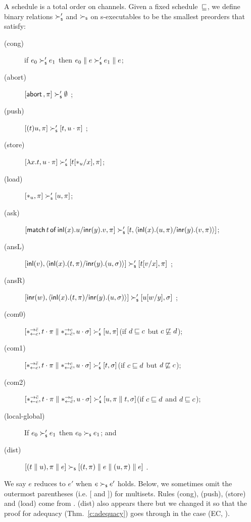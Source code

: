 A schedule is a total order on channels.
Given a fixed schedule~$\sqsubseteq$,
we define binary relations $\succ_{\mathsf s}'$ and $\succ_{\mathsf s}$
on s-executables
to be the smallest preorders
that satisfy:
\begin{description}
 \item[(cong)] if
      $e_0         \succ_{\mathsf s}' e_1$
      then
      $e_0 \parallel e \succ_{\mathsf s}' e_1\parallel e$\enspace;
 \item[(abort)] $[\mathsf{abort\,},\pi]\succ_{\mathsf s}' \emptyset$ \enspace;
 \item[(push)]
	    $[(t)u,\pi]      \succ_{\mathsf s}' [t,u\cdot\pi]$      \enspace;
 \item[(store)]
	    $[\lambda x.t,u\cdot\pi]
	     \succ_{\mathsf s}'
	     [t[\ast_u/x],      \pi]$\enspace;
 \item[(load)]
	    $[\ast_u,\pi]\succ_{\mathsf s}' [u,\pi]$\enspace;
 \item[(ask)]
      $[\mathsf{match}\,{t}\,\mathsf{of}\, \mathsf{inl}({x}). {u}/ \mathsf{inr}({y}). {v},\pi]\succ_{\mathsf s}' [t,\langle \mathsf{inl}({x}). ({u},{\pi})/ \mathsf{inr}({y}). ({v},{\pi})\rangle]$\enspace;
 \item[(ansL)]
           $[\mathsf{inl}({v}), \langle \mathsf{inl}({x}). ({t},{\pi})/ \mathsf{inr}({y}). ({u},{\sigma})\rangle] \succ_{\mathsf s}' [t[v/x],\pi] $ \enspace;
 \item[(ansR)]
           $[\mathsf{inr}({w}), \langle \mathsf{inl}({x}). ({t},{\pi})/ \mathsf{inr}({y}). ({u},{\sigma})\rangle] \succ_{\mathsf s}' [u[w/y],\sigma] $ \enspace;
 \item[(com0)]
           $[\ast^{\rightarrow {\bar{c}}}_{\leftarrow{c}}, t\cdot\pi\parallel \ast^{\rightarrow {c}}_{\leftarrow{\bar{c}}},
           u\cdot\sigma] \succ_{\mathsf s}'
           [u,\pi]$\enspace(if $d\sqsubseteq c$ but $c\not\sqsubseteq d$)\enspace;
 \item[(com1)]
	    $[\ast^{\rightarrow {\bar{c}}}_{\leftarrow{c}}, t\cdot\pi\parallel \ast^{\rightarrow {c}}_{\leftarrow{\bar{c}}},
	    u\cdot\sigma] \succ_{\mathsf s}'
	    [t,\sigma]$\enspace(if $c\sqsubseteq d$ but $d\not\sqsubseteq c$)\enspace;
 \item[(com2)]
	    $[\ast^{\rightarrow {\bar{c}}}_{\leftarrow{c}}, t\cdot\pi\parallel \ast^{\rightarrow {c}}_{\leftarrow{\bar{c}}},
	    u\cdot\sigma] \succ_{\mathsf s}'
	    [u,\pi\parallel t,\sigma]$\enspace(if $c\sqsubseteq d$ and $d\sqsubseteq
       c$)\enspace;
 \item[(local-global)] If $e_0\succ_{\mathsf s}'e_1$ then $e_0\succ_{\mathsf s} e_1$\enspace; and
 \item[(dist)]
           $[(t\parallel u),\pi\parallel e]  \succ_{\mathsf s} [(t,\pi)\parallel e\parallel (u,\pi)\parallel
      e]$ \enspace.
\end{description}
We say $e$ reduces to $e'$ when $e\succ_{\mathsf s} e'$ holds.
Below, we sometimes omit the outermost parentheses (i.e. [ and ]) for multisets.
Rules (cong), (push), (store) and (load) come from
\citet{danos-krivine}.  (dist) also appears there but we changed it so
that the proof for adequacy (Thm.~\ref{c:adequacy}) goes through in the
case (EC, \textminus).

